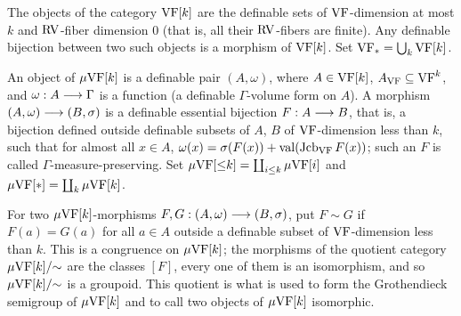 \setcounter{theorem}{3}
\begin{definition}[$\VF$-categories]
\label{defn-VF-cat}
\leanok
{}
The objects of the category $\mathrm{VF}[k]$ are the definable sets of $\VF$-dimension at most $k$ and $\mathrm{RV}$-fiber dimension $0$ (that is, all their $\mathrm{RV}$-fibers are finite). Any definable bijection between two such objects is a morphism of $\mathrm{VF}[k]$. Set $\mathrm{VF}_* = \bigcup_k \mathrm{VF}[k]$.
\end{definition}

\setcounter{theorem}{4}
\begin{definition}
\label{defn-VF-mu-G}
\leanok
{}
An object of $\mu\mathrm{VF}[k]$ is a definable pair $(A, \omega)$, where $A \in \mathrm{VF}[k]$, $A_{\mathrm{VF}} \subseteq \mathrm{VF}^k$, and $\omega : A \longrightarrow \Gamma$ is a function (a definable $\Gamma$-volume form on $A$). A morphism $(A, \omega) \longrightarrow (B, \sigma)$ is a definable essential bijection $F : A \longrightarrow B$, that is, a bijection defined outside definable subsets of $A$, $B$ of $\VF$-dimension less than $k$, such that for almost all $x \in A$, $\omega(x) = \sigma(F(x)) + \operatorname{val}(\operatorname{Jcb}_{\mathrm{VF}} F(x))$; such an $F$ is called $\Gamma$-measure-preserving. Set $\mu\mathrm{VF}[{\leq}k] = \coprod_{i \leq k} \mu\mathrm{VF}[i]$ and $\mu\mathrm{VF}[*] = \coprod_k \mu\mathrm{VF}[k]$.
\end{definition}

\setcounter{theorem}{6}
\begin{remark}
\label{mor-equi}
\leanok
{}
For two $\mu\mathrm{VF}[k]$-morphisms $F, G : (A, \omega) \longrightarrow (B, \sigma)$, put $F \sim G$ if $F(a) = G(a)$ for all $a \in A$ outside a definable subset of $\VF$-dimension less than $k$. This is a congruence on $\mu\mathrm{VF}[k]$; the morphisms of the quotient category $\mu\mathrm{VF}[k]/{\sim}$ are the classes $[F]$, every one of them is an isomorphism, and so $\mu\mathrm{VF}[k]/{\sim}$ is a groupoid. This quotient is what is used to form the Grothendieck semigroup of $\mu\mathrm{VF}[k]$ and to call two objects of $\mu\mathrm{VF}[k]$ isomorphic.
\end{remark}

